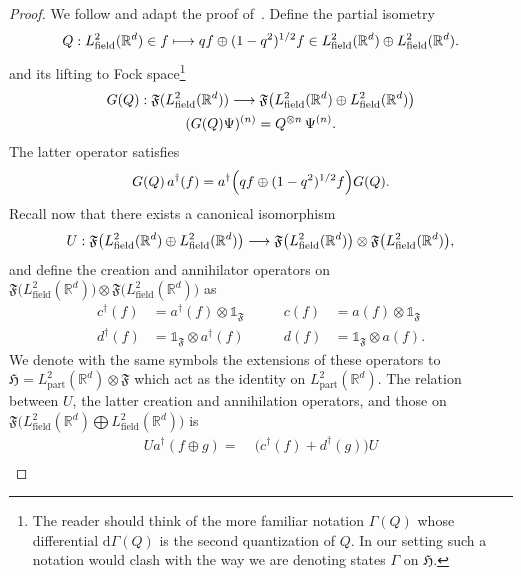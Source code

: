 \documentclass[AHL,Unicode,longabstracts,published]{cedram}
\DeclareMathOperator{\partt}{part}
\DeclareMathOperator{\field}{field}
\newcommand{\rmd}{\mathrm{d}}
\newcommand{\R}{\mathbb{R}}
\newcommand{\gH}{\mathfrak{H}}
\newcommand{\gF}{\mathfrak{F}}
\newcommand{\1}{\mathds{1}}
\let\oldin\in
\renewcommand{\in}{\mathchoice{\oldin}{\oldin}{\,\oldin\,}{\,\oldin\,}}
\renewcommand*{\to}{\mathchoice{\longrightarrow}{\rightarrow}{\rightarrow}{\rightarrow}}
\let\oldmapsto\mapsto
\renewcommand*{\mapsto}{\mathchoice{\longmapsto}{\oldmapsto}{\oldmapsto}{\oldmapsto}}
\let\originalleft\left
\let\originalright\right
\renewcommand{\left}{\mathopen{}\mathclose\bgroup\originalleft}
\renewcommand{\right}{\aftergroup\egroup\originalright}
\begin{document}
\begin{proof}
We follow and adapt the proof of~\cite[Section~A.1.2]{HaiLewSol-09b}. Define the partial isometry
\begin{equation}
Q: L^2_{\field}(\R^d) \in f \mapsto q f \oplus(1-q^2)^{1/2} f \in L^2_{\field}(\R^d) \oplus L^2_{\field}(\R^d).
\end{equation}
and its lifting to Fock space\footnote{The reader should think of the more familiar notation $\Gamma(Q)$ whose differential $\rmd\Gamma (Q)$ is the second quantization of $Q$. In our setting such a notation would clash with the way we are denoting states $\Gamma$ on $ \gH$.}
\begin{equation}
\begin{gathered}
G(Q):\gF(L^2_{\field}(\R^d)) \to \gF\big(L^2_{\field}(\R^d)\oplus L^2_{\field}(\R^d)\big)\\
(G(Q)\Psi)^{(n)}=Q^{\otimes n} \,\Psi^{(n)}.
\end{gathered}
\end{equation}
The latter operator satisfies
\begin{equation}
G(Q) \,a^\dagger(f)=a^\dagger\left(qf\oplus (1-q^2)^{1/2}f\right) G(Q).
\end{equation}
Recall now that there exists a canonical isomorphism
\begin{equation}
U:\gF \big(L^2_{\field}(\R^d)\oplus L^2_{\field}(\R^d)\big) \to \gF\big(L^2_{\field}(\R^d)\big) \otimes \gF\big(L^2_{\field}(\R^d)\big),
\end{equation}
and define the creation and annihilator operators on $
\gF\big(L^2_{\field}(\R^d)\big) \otimes
\gF\big(L^2_{\field}(\R^d)\big)$ as
\begin{equation}
\begin{aligned}
c^\dagger(f)&= a^\dagger(f)\otimes \1_{\gF}\qquad &c(f) &=a(f)\otimes \1_{\gF}\\
d^\dagger(f) &= \1_{\gF}\otimes a^\dagger(f)\qquad &d(f) &=\1_{\gF}\otimes a(f).
\end{aligned}
\end{equation}
We denote with the same symbols the extensions of these operators to $ \gH=L^2_{\partt}(\R^d)\otimes \gF$ which act as the identity on $L^2_{\partt}(\R^d)$. The relation between $U$, the latter creation and annihilation operators, and those on $\gF\big(L^2_{\field}(\R^d)\bigoplus L^2_{\field}(\R^d)\big)$ is
\begin{equation}
\begin{split}
Ua^\dagger(f\oplus g)=\;&\big(c^\dagger(f)+d^\dagger(g)\big)U\\

\end{split}
\end{equation}
\end{proof}
\end{document}
